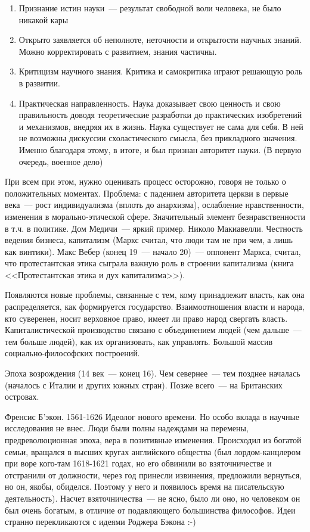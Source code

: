 \begin{enumerate}
	\item Признание истин науки~--- результат свободной воли человека, не было никакой кары
	\item Открыто заявляется об неполноте, неточности и открытости научных знаний. Можно корректировать с развитием, знания частичны.
	\item Критицизм научного знания. Критика и самокритика играют решающую роль в развитии.
	\item Практическая направленность. Наука доказывает свою ценность и свою правильность доводя теоретические разработки до практических изобретений и механизмов, внедряя их в жизнь. Наука существует не сама для себя. В ней не возможны дискуссии схоластического смысла, без прикладного значения. Именно благодаря этому, в итоге, и был признан авторитет науки. (В первую очередь, военное дело)
\end{enumerate}
При всем при этом, нужно оценивать процесс осторожно, говоря не только о положительных моментах. Проблема: с падением авторитета церкви в первые века~--- рост индивидуализма (вплоть до анархизма), ослабление нравственности, изменения в морально-этической сфере. Значительный элемент безнравственности в т.ч. в политике. Дом Медичи~--- яркий пример. Николо Макиавелли.
Честность ведения бизнеса, капитализм (Маркс считал, что люди там не при чем, а лишь как винтики). Макс Вебер (конец 19~--- начало 20)~--- оппонент Маркса, считал, что протестантская этика сыграла важную роль в строении капитализма (книга <<Протестантская этика и дух капитализма>>).

Появляются новые проблемы, связанные с тем, кому принадлежит власть, как она распределяется, как формируется государство. Взаимоотношения власти и народа, кто суверенен, носит верховное право, имеет ли право народ свергать власть. Капиталистической производство связано с объединением людей (чем дальше~--- тем больше людей), как их организовать, как управлять. Большой массив социально-философских построений.

Эпоха возрождения (14 век~--- конец 16). Чем севернее~--- тем позднее началась (началось с Италии и других южных стран). Позже всего~--- на Британских островах.

Френсис Б'экон. 1561-1626
Идеолог нового времени. Но особо вклада в научные исследования не внес. Люди были полны надеждами на перемены, предреволюционная эпоха, вера в позитивные изменения. Происходил из богатой семьи, вращался в высших кругах английского общества (был лордом-канцлером при воре кого-там 1618-1621 годах, но его обвинили во взяточничестве и отстранили от должности, через год принесли извинения, предложили вернуться, но он, якобы, обиделся. Поэтому у него и появилось время на писательскую деятельность). Насчет взяточничества~--- не ясно, было ли оно, но человеком он был очень богатым, в отличие от подавляющего большинства философов. Идеи странно перекликаются с идеями Роджера Бэкона :-)

